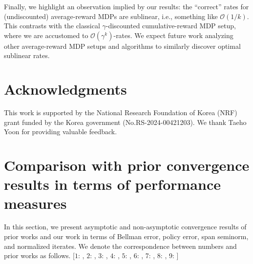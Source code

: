 \documentclass{article} %
\begin{document}
Finally, we highlight an observation implied by our results: the ``correct'' rates for (undiscounted) average-reward MDPs are sublinear, i.e., something like $\mathcal{O}(1/k)$. This contrasts with the classical $\gamma$-discounted cumulative-reward MDP setup, where we are accustomed to $\mathcal{O}(\gamma^k)$-rates. We expect future work analyzing other average-reward MDP setups and algorithms to similarly discover optimal sublinear rates. 

\section{Acknowledgments}
This work is supported by the National Research Foundation of Korea (NRF) grant funded by the Korea government (No.RS-2024-00421203). We thank Taeho Yoon for providing valuable feedback.




\newpage

\appendix
\section{Comparison with prior convergence results in terms of performance measures}\label{s::conv_measure}
In this section, we present asymptotic and non-asymptotic convergence results of prior works and our work in terms of Bellman error, policy error, span seminorm, and normalized iterates. We denote the correspondence between numbers and prior works as follows. [$1$: \citet{federgruen1978contraction}, $2$: \citet{van1981stochastic}, $3$: \citet{schweitzer1977asymptotic}, $4$: \citet{schweitzer1979geometric}, $5$: \citet{bertsekas1998new}, 6: \citet{10.5555/528623}, 7:  \citet{bravo2024stochastic}, 8: \citet{bravostochastic}, 9: \citet{bertsekas2015dynamic}]
\end{document}

